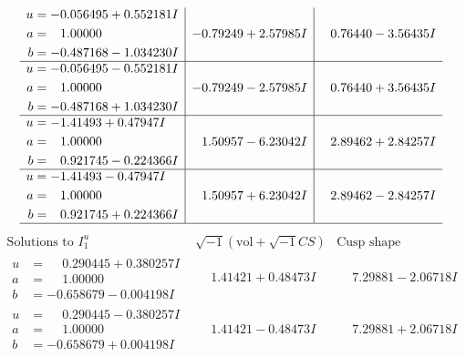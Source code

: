 \documentclass[1p]{elsarticle_modified}
\theoremstyle{definition}
\newcommand{\I}{\sqrt{-1}}
\begin{document}
$$\begin{array}{c|c|c}
\begin{aligned}
u &= -0.056495 + 0.552181 I \\
a &= \phantom{-}1.00000\phantom{ +0.000000I} \\
b &= -0.487168 - 1.034230 I\end{aligned}
 & -0.79249 + 2.57985 I & \phantom{-}0.76440 - 3.56435 I \\ \hline\begin{aligned}
u &= -0.056495 - 0.552181 I \\
a &= \phantom{-}1.00000\phantom{ +0.000000I} \\
b &= -0.487168 + 1.034230 I\end{aligned}
 & -0.79249 - 2.57985 I & \phantom{-}0.76440 + 3.56435 I \\ \hline\begin{aligned}
u &= -1.41493 + 0.47947 I \\
a &= \phantom{-}1.00000\phantom{ +0.000000I} \\
b &= \phantom{-}0.921745 - 0.224366 I\end{aligned}
 & \phantom{-}1.50957 - 6.23042 I & \phantom{-}2.89462 + 2.84257 I \\ \hline\begin{aligned}
u &= -1.41493 - 0.47947 I \\
a &= \phantom{-}1.00000\phantom{ +0.000000I} \\
b &= \phantom{-}0.921745 + 0.224366 I\end{aligned}
 & \phantom{-}1.50957 + 6.23042 I & \phantom{-}2.89462 - 2.84257 I\\
 \hline 
 \end{array}$$\newpage$$\begin{array}{c|c|c}  
\text{Solutions to }I^u_{1}& \I (\text{vol} + \sqrt{-1}CS) & \text{Cusp shape}\\
 \hline 
\begin{aligned}
u &= \phantom{-}0.290445 + 0.380257 I \\
a &= \phantom{-}1.00000\phantom{ +0.000000I} \\
b &= -0.658679 - 0.004198 I\end{aligned}
 & \phantom{-}1.41421 + 0.48473 I & \phantom{-}7.29881 - 2.06718 I \\ \hline\begin{aligned}
u &= \phantom{-}0.290445 - 0.380257 I \\
a &= \phantom{-}1.00000\phantom{ +0.000000I} \\
b &= -0.658679 + 0.004198 I\end{aligned}
 & \phantom{-}1.41421 - 0.48473 I & \phantom{-}7.29881 + 2.06718 I \\ \hline\begin{aligned}

\end{aligned}
\end{array}$$
\end{document}
